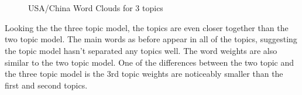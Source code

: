 \begin{figure}[H]
	\centering
	\\
	\\
	
	\caption{USA/China Word Clouds for 3 topics}
	\label{fig:usa3}
\end{figure}

Looking the the three topic model, the topics are even closer together than the two topic model. The main words as before appear in all of the topics, suggesting the topic model hasn't separated any topics well. The word weights are also similar to the two topic model. One of the differences between the two topic and the three topic model is the 3rd topic weights are noticeably smaller than the first and second topics. 

